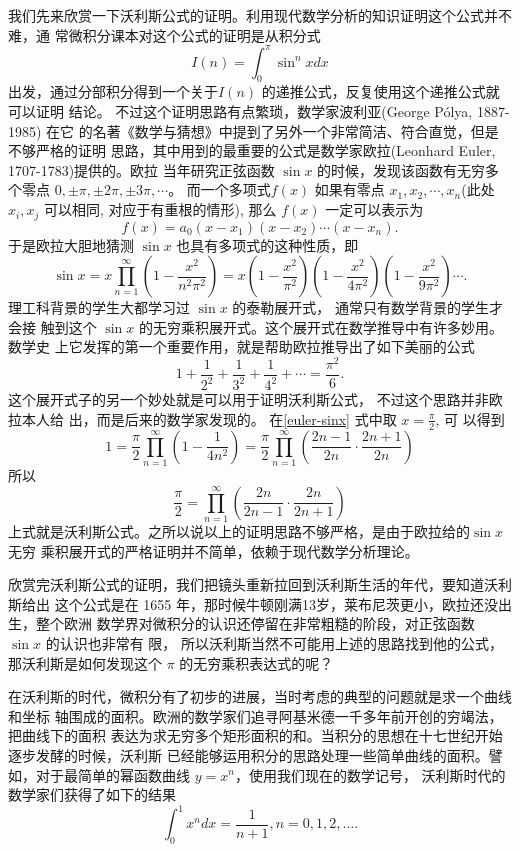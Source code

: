 我们先来欣赏一下沃利斯公式的证明。利用现代数学分析的知识证明这个公式并不难，通
常微积分课本对这个公式的证明是从积分式
$$ I(n) = \int_0^\pi \sin^nxdx $$
出发，通过分部积分得到一个关于$I(n)$ 的递推公式，反复使用这个递推公式就可以证明
结论。 不过这个证明思路有点繁琐，数学家波利亚(George P\'{o}lya, 1887-1985) 在它
的名著《数学与猜想》中提到了另外一个非常简洁、符合直觉，但是不够严格的证明
思路，其中用到的最重要的公式是数学家欧拉(Leonhard Euler, 1707-1783)提供的。欧拉
当年研究正弦函数 $\sin x$ 的时候，发现该函数有无穷多个零点 $0, \pm\pi, \pm
2\pi, \pm 3\pi, \cdots $。 而一个多项式$f(x)$ 如果有零点 $x_1, x_2, \cdots,
x_n$(此处$x_i, x_j$ 可以相同, 对应于有重根的情形), 那么 $f(x)$ 一定可以表示为 
$$ f(x) = a_0 (x-x_1) (x-x_2) \cdots (x-x_n) .$$ 
于是欧拉大胆地猜测 $\sin x$ 也具有多项式的这种性质，即
\begin{equation}
\label{euler-sinx}
\sin x = x \prod_{n=1}^\infty\left(1 - \frac{x^2}{n^2\pi^2}\right) 
= x (1- \frac{x^2}{\pi^2})  (1- \frac{x^2}{4\pi^2})  (1- \frac{x^2}{9\pi^2}) \cdots .
\end{equation}
理工科背景的学生大都学习过 $\sin x$ 的泰勒展开式， 通常只有数学背景的学生才会接
触到这个 $\sin x$ 的无穷乘积展开式。这个展开式在数学推导中有许多妙用。数学史
上它发挥的第一个重要作用，就是帮助欧拉推导出了如下美丽的公式
$$ 1 + \frac{1}{2^2} + \frac{1}{3^2} + \frac{1}{4^2} +  \cdots  = \frac{\pi^2}{6} . $$ 
这个展开式子的另一个妙处就是可以用于证明沃利斯公式， 不过这个思路并非欧拉本人给
出，而是后来的数学家发现的。 在\eqref{euler-sinx} 式中取 $x=\frac{\pi}{2}$, 可
以得到
$$ 1 = \frac{\pi}{2} \prod_{n=1}^\infty\left(1 - \frac{1}{4n^2}\right)
= \frac{\pi}{2} \prod_{n=1}^\infty\left(\frac{2n-1}{2n} \cdot \frac{2n+1}{2n}\right) 
$$
所以
$$ \frac{\pi}{2} = \prod_{n=1}^\infty\left(\frac{2n}{2n-1} \cdot \frac{2n}{2n+1}\right) 
$$
上式就是沃利斯公式。之所以说以上的证明思路不够严格，是由于欧拉给的$\sin x$ 无穷
乘积展开式的严格证明并不简单，依赖于现代数学分析理论。 

欣赏完沃利斯公式的证明，我们把镜头重新拉回到沃利斯生活的年代，要知道沃利斯给出
这个公式是在 1655 年，那时候牛顿刚满13岁，莱布尼茨更小，欧拉还没出生，整个欧洲
数学界对微积分的认识还停留在非常粗糙的阶段，对正弦函数 $\sin x$ 的认识也非常有
限， 所以沃利斯当然不可能用上述的思路找到他的公式， 那沃利斯是如何发现这个
$\pi$ 的无穷乘积表达式的呢？

在沃利斯的时代，微积分有了初步的进展，当时考虑的典型的问题就是求一个曲线和坐标
轴围成的面积。欧洲的数学家们追寻阿基米德一千多年前开创的穷竭法，把曲线下的面积
表达为求无穷多个矩形面积的和。当积分的思想在十七世纪开始逐步发酵的时候，沃利斯
已经能够运用积分的思路处理一些简单曲线的面积。譬如，对于最简单的幂函数曲线
$y=x^n$，使用我们现在的数学记号， 沃利斯时代的数学家们获得了如下的结果
$$ \int_0^1 x^n dx = \frac{1}{n+1},  n=0,1,2,\ldots .$$

